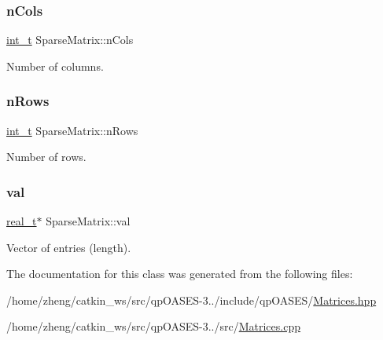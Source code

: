\subsubsection{\texorpdfstring{n\+Cols}{nCols}}
{\footnotesize\ttfamily \hyperlink{_types_8hpp_ab6fd6105e64ed14a0c9281326f05e623}{int\+\_\+t} Sparse\+Matrix\+::n\+Cols\hspace{0.3cm}{\ttfamily [protected]}}

Number of columns. \mbox{\label{class_sparse_matrix_abef34a6737a6253676e85ea7350e882b}} 
\subsubsection{\texorpdfstring{n\+Rows}{nRows}}
{\footnotesize\ttfamily \hyperlink{_types_8hpp_ab6fd6105e64ed14a0c9281326f05e623}{int\+\_\+t} Sparse\+Matrix\+::n\+Rows\hspace{0.3cm}{\ttfamily [protected]}}

Number of rows. \mbox{\label{class_sparse_matrix_aa8f38b3ba839a4b3e7d04fb66d4fca7b}} 
\subsubsection{\texorpdfstring{val}{val}}
{\footnotesize\ttfamily \hyperlink{qp_o_a_s_e_s__wrapper_8h_a0d00e2b3dfadee81331bbb39068570c4}{real\+\_\+t}$\ast$ Sparse\+Matrix\+::val\hspace{0.3cm}{\ttfamily [protected]}}

Vector of entries (length). 

The documentation for this class was generated from the following files\+:\begin{DoxyCompactItemize}
\item 
/home/zheng/catkin\+\_\+ws/src/qp\+O\+A\+S\+E\+S-\/3../include/qp\+O\+A\+S\+E\+S/\hyperlink{_matrices_8hpp}{Matrices.\+hpp}\item 
/home/zheng/catkin\+\_\+ws/src/qp\+O\+A\+S\+E\+S-\/3../src/\hyperlink{_matrices_8cpp}{Matrices.\+cpp}\end{DoxyCompactItemize}
